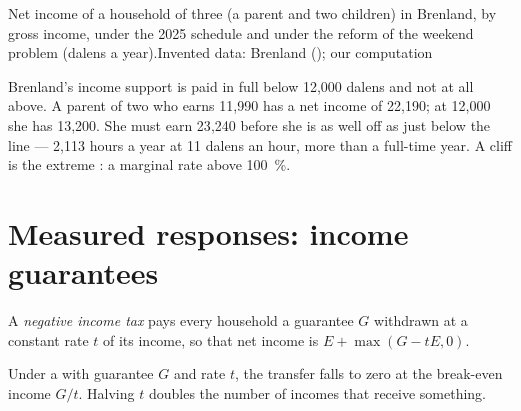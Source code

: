 \begin{omchart}{Net income of a household of three (a parent and two children) in
Brenland, by gross income, under the 2025 schedule and under the reform of the
weekend problem (dalens a year).}{Invented data: Brenland (); our
computation}
\end{omchart}

Brenland's income support is paid in full below 12{,}000 dalens and not at all above.
A parent of two who earns 11{,}990 has a net income of 22{,}190; at 12{,}000 she has
13{,}200. She must earn 23{,}240 before she is as well off as just below the line ---
2{,}113 hours a year at 11 dalens an hour, more than a full-time year. A cliff is the
extreme : a marginal rate above 100~\%.

\section{Measured responses: income guarantees}\label{sec:b3:transfers-and-incentives:nit}

\begin{definition}\label{def:b3:transfers-and-incentives:nit}
A \emph{negative income tax} pays every household a guarantee $G$ withdrawn at a
constant rate $t$ of its income, so that net income is $E + \max(G - tE, 0)$.
\end{definition}

\begin{proposition}\label{prop:b3:transfers-and-incentives:breakeven}
Under a  with guarantee $G$ and rate $t$, the transfer falls to zero
at the break-even income $G/t$. Halving $t$ doubles the number of incomes that receive
something.
\end{proposition}

